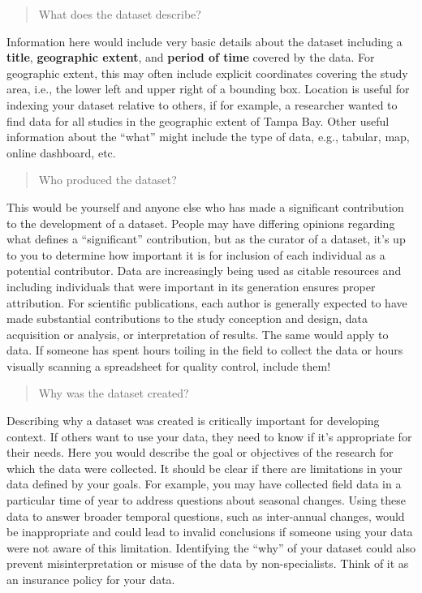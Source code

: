 \documentclass[
]{book}
\begin{document}
\begin{quote}
What does the dataset describe?
\end{quote}

Information here would include very basic details about the dataset including a \textbf{title}, \textbf{geographic extent}, and \textbf{period of time} covered by the data. For geographic extent, this may often include explicit coordinates covering the study area, i.e., the lower left and upper right of a bounding box. Location is useful for indexing your dataset relative to others, if for example, a researcher wanted to find data for all studies in the geographic extent of Tampa Bay. Other useful information about the ``what'' might include the type of data, e.g., tabular, map, online dashboard, etc.

\begin{quote}
Who produced the dataset?
\end{quote}

This would be yourself and anyone else who has made a significant contribution to the development of a dataset. People may have differing opinions regarding what defines a ``significant'' contribution, but as the curator of a dataset, it's up to you to determine how important it is for inclusion of each individual as a potential contributor. Data are increasingly being used as citable resources and including individuals that were important in its generation ensures proper attribution. For scientific publications, each author is generally expected to have made substantial contributions to the study conception and design, data acquisition or analysis, or interpretation of results. The same would apply to data. If someone has spent hours toiling in the field to collect the data or hours visually scanning a spreadsheet for quality control, include them!

\begin{quote}
Why was the dataset created?
\end{quote}

Describing why a dataset was created is critically important for developing context. If others want to use your data, they need to know if it's appropriate for their needs. Here you would describe the goal or objectives of the research for which the data were collected. It should be clear if there are limitations in your data defined by your goals. For example, you may have collected field data in a particular time of year to address questions about seasonal changes. Using these data to answer broader temporal questions, such as inter-annual changes, would be inappropriate and could lead to invalid conclusions if someone using your data were not aware of this limitation. Identifying the ``why'' of your dataset could also prevent misinterpretation or misuse of the data by non-specialists. Think of it as an insurance policy for your data.
\end{document}
